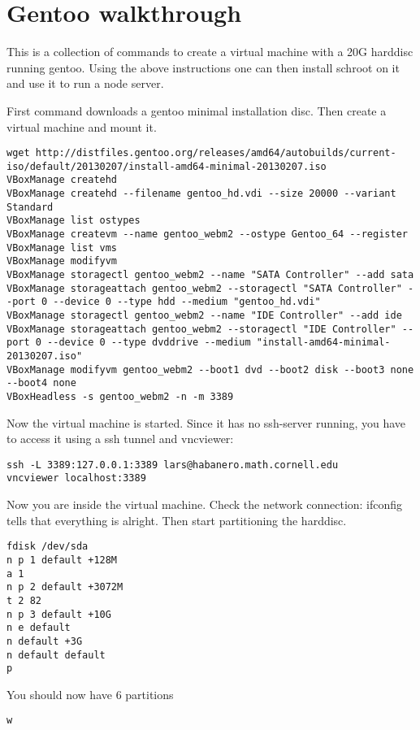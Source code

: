 \documentclass[a4paper]{book}
\begin{document}
\chapter{Gentoo walkthrough}
This is a collection of commands to create a virtual machine with a 20G harddisc running gentoo. Using the above instructions one can then install schroot on it and use it to run a node server.

First command downloads a gentoo minimal installation disc. Then create a virtual machine and mount it.
\begin{verbatim}
wget http://distfiles.gentoo.org/releases/amd64/autobuilds/current-iso/default/20130207/install-amd64-minimal-20130207.iso
VBoxManage createhd
VBoxManage createhd --filename gentoo_hd.vdi --size 20000 --variant Standard
VBoxManage list ostypes
VBoxManage createvm --name gentoo_webm2 --ostype Gentoo_64 --register
VBoxManage list vms
VBoxManage modifyvm
VBoxManage storagectl gentoo_webm2 --name "SATA Controller" --add sata
VBoxManage storageattach gentoo_webm2 --storagectl "SATA Controller" --port 0 --device 0 --type hdd --medium "gentoo_hd.vdi"
VBoxManage storagectl gentoo_webm2 --name "IDE Controller" --add ide
VBoxManage storageattach gentoo_webm2 --storagectl "IDE Controller" --port 0 --device 0 --type dvddrive --medium "install-amd64-minimal-20130207.iso"
VBoxManage modifyvm gentoo_webm2 --boot1 dvd --boot2 disk --boot3 none --boot4 none
VBoxHeadless -s gentoo_webm2 -n -m 3389
\end{verbatim}

Now the virtual machine is started. Since it has no ssh-server running, you have to access it using a ssh tunnel and vncviewer:
\begin{verbatim}
ssh -L 3389:127.0.0.1:3389 lars@habanero.math.cornell.edu
vncviewer localhost:3389
\end{verbatim}

Now you are inside the virtual machine. Check the network connection:
ifconfig tells that everything is alright.
Then start partitioning the harddisc.
\begin{verbatim}
fdisk /dev/sda
n p 1 default +128M
a 1
n p 2 default +3072M
t 2 82
n p 3 default +10G
n e default
n default +3G
n default default
p
\end{verbatim}
You should now have 6 partitions
\begin{verbatim}
w
\end{verbatim}
\end{document}
